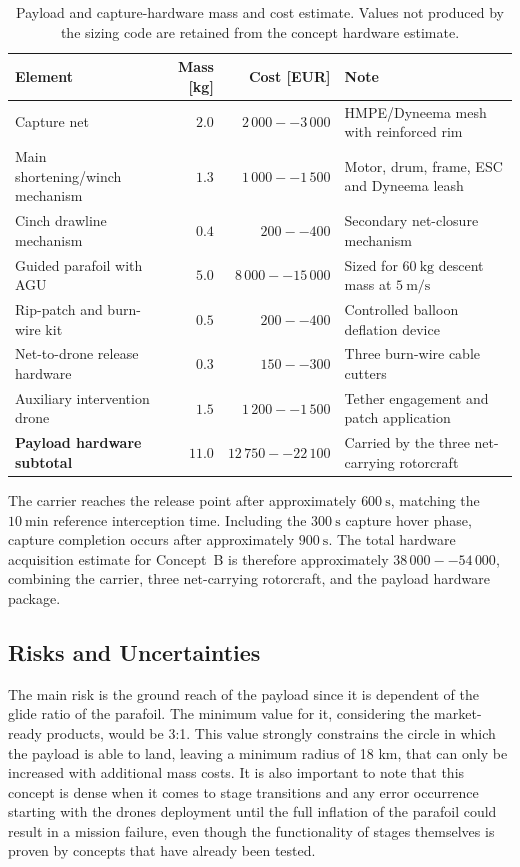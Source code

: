 \begin{table}[H]
\centering
\small
\caption{Payload and capture-hardware mass and cost estimate. Values not produced by the sizing code are retained from the concept hardware estimate.}
\label{tab:conceptB_payload_compact}
\setlength{\tabcolsep}{4pt}
\begin{tabularx}{\linewidth}{lrrX}
\hline
\textbf{Element} & \textbf{Mass [kg]} & \textbf{Cost [EUR]} & \textbf{Note} \\
\hline
Capture net & $2.0$ & $2\,000--3\,000$ & HMPE/Dyneema mesh with reinforced rim \\
Main shortening/winch mechanism & $1.3$ & $1\,000--1\,500$ & Motor, drum, frame, ESC and Dyneema leash \\
Cinch drawline mechanism & $0.4$ & $200--400$ & Secondary net-closure mechanism \\
Guided parafoil with AGU & $5.0$ & $8\,000--15\,000$ & Sized for $60~\mathrm{kg}$ descent mass at $5~\mathrm{m/s}$ \\
Rip-patch and burn-wire kit & $0.5$ & $200--400$ & Controlled balloon deflation device \\
Net-to-drone release hardware & $0.3$ & $150--300$ & Three burn-wire cable cutters \\
Auxiliary intervention drone & $1.5$ & $1\,200--1\,500$ & Tether engagement and patch application \\
\hline
\textbf{Payload hardware subtotal} & \textbf{$11.0$} & \textbf{$12\,750--22\,100$} & Carried by the three net-carrying rotorcraft \\
\hline
\end{tabularx}
\end{table}

The carrier reaches the release point after approximately $600~\mathrm{s}$, matching the $10~\mathrm{min}$ reference interception time. Including the $300~\mathrm{s}$ capture hover phase, capture completion occurs after approximately $900~\mathrm{s}$. The total hardware acquisition estimate for Concept~B is therefore approximately $38\,000--54\,000$, combining the carrier, three net-carrying rotorcraft, and the payload hardware package.



\subsection{Risks and Uncertainties}
The main risk is the ground reach of the payload since it is dependent of the glide ratio of the parafoil. The minimum value for it, considering the market-ready products, would be 3:1. This value strongly constrains the circle in which the payload is able to land, leaving a minimum radius of 18 km, that can only be increased with additional mass costs. It is also important to note that this concept is dense when it comes to stage transitions and any error occurrence starting with the drones deployment until the full inflation of the parafoil could result in a mission failure, even though the functionality of stages themselves is proven by concepts that have already been tested.

